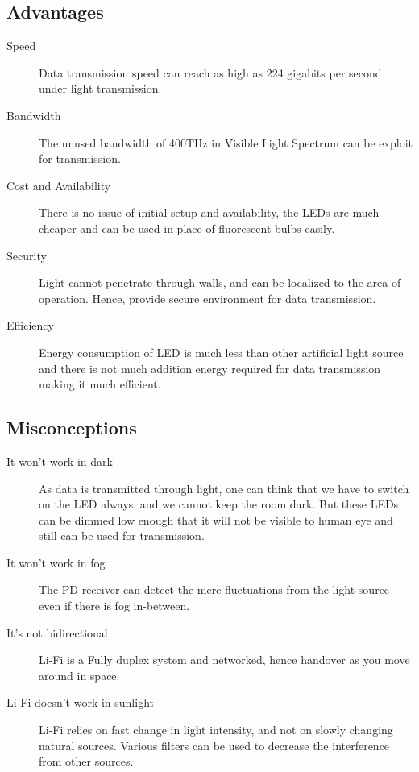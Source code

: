\documentclass{article}
\begin{document}
\subsection{Advantages}
\begin{description}
    \item [Speed] Data transmission speed can reach as high as 224 gigabits per second under light transmission.

    \item [Bandwidth] The unused bandwidth of 400THz in Visible Light Spectrum can be exploit for transmission. 

    \item [Cost and Availability]  There is no issue of initial setup and availability, the LEDs are much cheaper and can be used in place of fluorescent bulbs easily.
    
    \item [Security]  Light cannot penetrate through walls, and can be localized to the area of operation. Hence, provide secure environment for data transmission.
    
    \item [Efficiency] Energy consumption of LED is much less than other artificial light source and there is not much addition energy required for data transmission making it much efficient.
    
\end{description}

\subsection{Misconceptions}
\begin{description}
    \item [It won't work in dark] As data is transmitted through light, one can think that we have to switch on the LED always, and we cannot keep the room dark. But these LEDs can be dimmed low enough that it will not be visible to human eye and still can be used for transmission.

    \item [It won't work in fog] The PD receiver can detect the mere fluctuations from the light source even if there is fog in-between.

    \item [It's not bidirectional] Li-Fi is a Fully duplex system and networked, hence handover as you move around in space.
    
    \item [Li-Fi doesn't work in sunlight] Li-Fi relies on fast change in light intensity, and not on slowly changing natural sources. Various filters can be used to decrease the interference from other sources.
    
\end{description}
\end{document}
